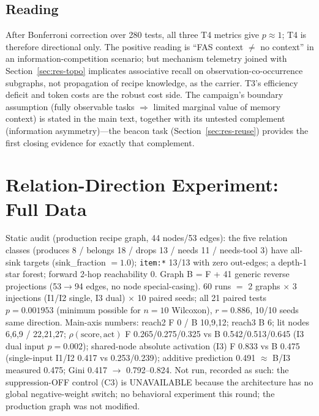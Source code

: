 \documentclass[10pt,a4paper]{article}
\begin{document}
\subsection{Reading}
After Bonferroni correction over 280 tests, all three T4 metrics give $p{\approx}1$; T4 is therefore directional only. The positive reading is ``FAS context $\neq$ no context'' in an information-competition scenario; but mechanism telemetry joined with Section~\ref{sec:res-topo} implicates associative recall on observation-co-occurrence subgraphs, not propagation of recipe knowledge, as the carrier. T3's efficiency deficit and token costs are the robust cost side. The campaign's boundary assumption (fully observable tasks $\Rightarrow$ limited marginal value of memory context) is stated in the main text, together with its untested complement (information asymmetry)---the beacon task (Section~\ref{sec:res-reuse}) provides the first closing evidence for exactly that complement.

\section{Relation-Direction Experiment: Full Data}
\label{app:reldir}
Static audit (production recipe graph, 44 nodes/53 edges): the five relation classes (produces 8 / belongs 18 / drops 13 / needs 11 / needs-tool 3) have all-sink targets (sink\_fraction $=1.0$); \texttt{item:*} 13/13 with zero out-edges; a depth-1 star forest; forward 2-hop reachability 0. Graph B = F + 41 generic reverse projections (53$\rightarrow$94 edges, no node special-casing). 60 runs $=$ 2 graphs $\times$ 3 injections (I1/I2 single, I3 dual) $\times$ 10 paired seeds; all 21 paired tests $p{=}0.001953$ (minimum possible for $n{=}10$ Wilcoxon), $r{=}0.886$, 10/10 seeds same direction. Main-axis numbers: reach2 F 0 / B 10,9,12; reach3 B 6; lit nodes 6,6,9 / 22,21,27; $\rho(\mathrm{score},\mathrm{act})$ F 0.265/0.275/0.325 vs B 0.542/0.513/0.645 (I3 dual input $p{=}0.002$); shared-node absolute activation (I3) F 0.833 vs B 0.475 (single-input I1/I2 0.417 vs 0.253/0.239); additive prediction 0.491 $\approx$ B/I3 measured 0.475; Gini 0.417 $\rightarrow$ 0.792--0.824. Not run, recorded as such: the suppression-OFF control (C3) is UNAVAILABLE because the architecture has no global negative-weight switch; no behavioral experiment this round; the production graph was not modified.
\end{document}

